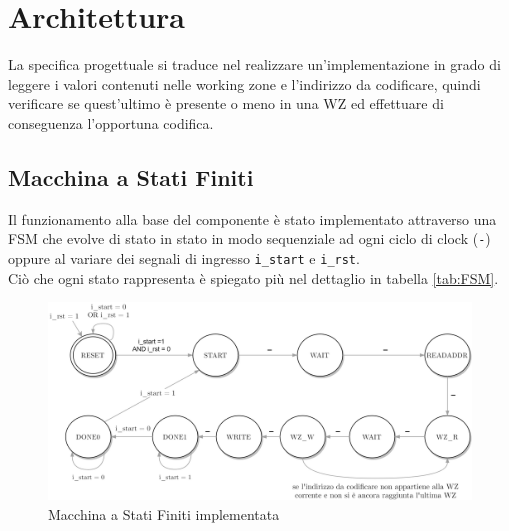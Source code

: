 \documentclass{article}
\begin{document}
\vspace{4mm}
\titlerule[0.4pt]


\pagebreak
\section{Architettura}
La specifica progettuale si traduce nel realizzare un'implementazione in grado di leggere i valori contenuti nelle working zone e l'indirizzo da codificare, quindi verificare se quest'ultimo è presente o meno in una WZ ed effettuare di conseguenza l'opportuna codifica.

\subsection{Macchina a Stati Finiti} \label{FSM-section}
Il funzionamento alla base del componente è stato implementato attraverso una FSM che evolve di stato in stato in modo sequenziale ad ogni ciclo di clock (\verb^-^) oppure al variare dei segnali di ingresso \verb^i_start^ e \verb^i_rst^.\\Ciò che ogni stato rappresenta è spiegato più nel dettaglio in tabella \ref{tab:FSM}.

\begin{figure}[H]
    \centering
    \includegraphics[width=1.0\textwidth]{images/FSM.png}
    \caption{Macchina a Stati Finiti implementata}
    \label{fig:FSM}
\end{figure}
\end{document}
